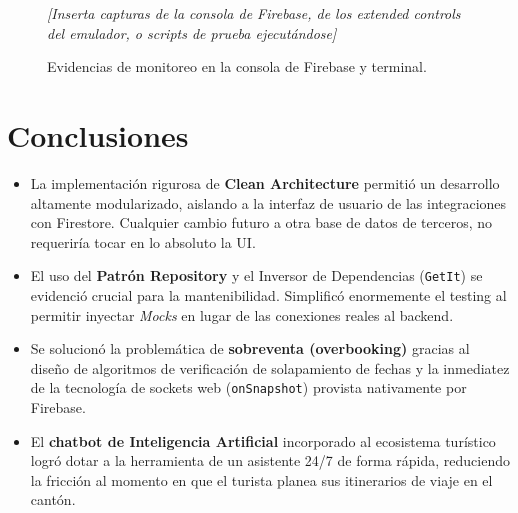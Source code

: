\documentclass{article}
\begin{document}
\begin{figure}[H]
    \centering
    \textit{[Inserta capturas de la consola de Firebase, de los extended controls del emulador, o scripts de prueba ejecutándose]}
    \caption{Evidencias de monitoreo en la consola de Firebase y terminal.}
\end{figure}

\section{Conclusiones}
\begin{itemize}[label=\small\color{verdeO}$\blacksquare$]
    \item La implementación rigurosa de \textbf{Clean Architecture} permitió un desarrollo altamente modularizado, aislando a la interfaz de usuario de las integraciones con Firestore. Cualquier cambio futuro a otra base de datos de terceros, no requeriría tocar en lo absoluto la UI.
    \item El uso del \textbf{Patrón Repository} y el Inversor de Dependencias (\texttt{GetIt}) se evidenció crucial para la mantenibilidad. Simplificó enormemente el testing al permitir inyectar \textit{Mocks} en lugar de las conexiones reales al backend.
    \item Se solucionó la problemática de \textbf{sobreventa (overbooking)} gracias al diseño de algoritmos de verificación de solapamiento de fechas y la inmediatez de la tecnología de sockets web (\texttt{onSnapshot}) provista nativamente por Firebase.
    \item El \textbf{chatbot de Inteligencia Artificial} incorporado al ecosistema turístico logró dotar a la herramienta de un asistente 24/7 de forma rápida, reduciendo la fricción al momento en que el turista planea sus itinerarios de viaje en el cantón.
\end{itemize}
\end{document}

